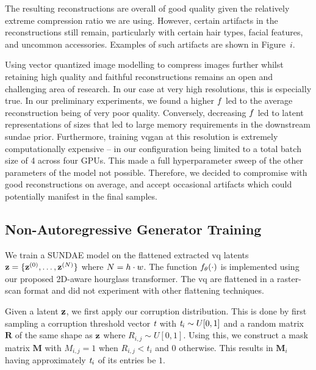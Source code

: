 The resulting reconstructions are overall of good quality given the relatively
extreme compression ratio we are using. However, certain artifacts in the
reconstructions still remain, particularly with certain hair types, facial
features, and uncommon accessories. Examples of such artifacts are shown in
Figure~$i$.

Using vector quantized image modelling to compress images further whilst
retaining high quality and faithful reconstructions remains an open and
challenging area of research. In our case at very high resolutions, this is
especially true. In our preliminary experiments, we found a higher
$f$ led to the average reconstruction being of very poor quality.
Conversely, decreasing $f$ led to latent representations of sizes
that led to large memory requirements in the downstream \gls{sundae} prior.
Furthermore, training \gls{vqgan} at this resolution is extremely
computationally expensive -- in our configuration being limited to a total batch
size of 4 across four GPUs. This made a full hyperparameter sweep of the other
parameters of the model not possible. Therefore, we decided to compromise with
good reconstructions on average, and accept occasional artifacts which could 
potentially manifest in the final samples.

\subsection{Non-Autoregressive Generator Training}


We train a SUNDAE model on the flattened extracted \gls{vq} latents $\mathbf{z} =
\{\mathbf{z}^{(0)}, \dots, \mathbf{z}^{(N)}\}$ where $N = h \cdot w$.
The function $f_\theta(\cdot)$ is implemented using our proposed 2D-aware
hourglass transformer. The \gls{vq} are flattened in a raster-scan format and
did not experiment with other flattening techniques.

Given a latent $\mathbf{z}$, we first apply our corruption distribution. This is
done by first sampling a corruption threshold vector $\textit{t}$ with
$\textit{t}_i \sim U[0, 1]$ and a random matrix $\mathbf{R}$ of the
same shape as $\mathbf{z}$ where $R_{i,j} \sim U[0,1]$. Using this, we construct a
mask matrix $\mathbf{M}$ with $M_{i,j} = 1$ when $R_{i,j} < t_i$ and $0$
otherwise. This results in $\mathbf{M}_i$ having approximately
$\textit{t}_i$ of its entries be $1$.

